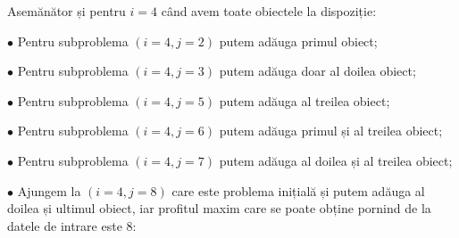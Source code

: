 \begin{sloppypar}
Asemănător și pentru $i = 4$ când avem toate obiectele la dispoziție: \par
$\bullet$ Pentru subproblema $(i = 4, j = 2)$ putem adăuga primul obiect; \par
$\bullet$ Pentru subproblema $(i = 4, j = 3)$ putem adăuga doar al doilea obiect; \par
$\bullet$ Pentru subproblema $(i = 4, j = 5)$ putem adăuga al treilea obiect; \par
$\bullet$ Pentru subproblema $(i = 4, j = 6)$ putem adăuga primul și al treilea obiect; \par
$\bullet$ Pentru subproblema $(i = 4, j = 7)$ putem adăuga al doilea și al treilea obiect; \par
$\bullet$ Ajungem la $(i = 4, j = 8)$ care este problema inițială și putem adăuga al doilea și ultimul obiect, iar profitul maxim care se poate obține pornind de la datele de intrare este 8:
\clearpage


\end{sloppypar}
